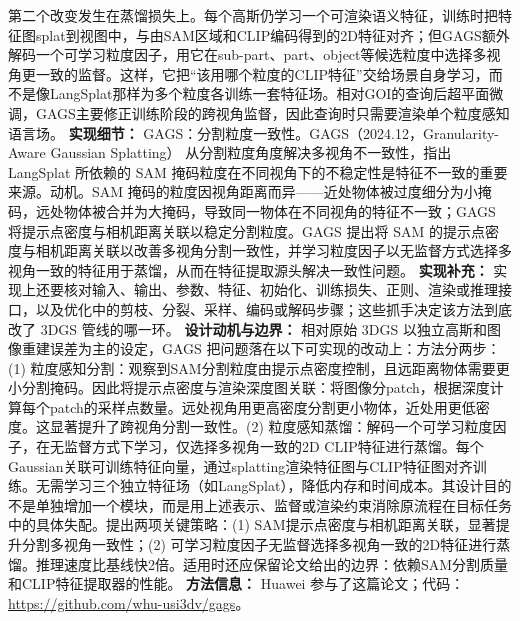 第二个改变发生在蒸馏损失上。每个高斯仍学习一个可渲染语义特征，训练时把特征图splat到视图中，与由SAM区域和CLIP编码得到的2D特征对齐；但GAGS额外解码一个可学习粒度因子，用它在sub-part、part、object等候选粒度中选择多视角更一致的监督。这样，它把“该用哪个粒度的CLIP特征”交给场景自身学习，而不是像LangSplat那样为多个粒度各训练一套特征场。相对GOI的查询后超平面微调，GAGS主要修正训练阶段的跨视角监督，因此查询时只需要渲染单个粒度感知语言场。
\textbf{实现细节：} GAGS：分割粒度一致性。GAGS（2024.12，Granularity-Aware Gaussian Splatting） 从分割粒度角度解决多视角不一致性，指出 LangSplat 所依赖的 SAM 掩码粒度在不同视角下的不稳定性是特征不一致的重要来源。动机。SAM 掩码的粒度因视角距离而异——近处物体被过度细分为小掩码，远处物体被合并为大掩码，导致同一物体在不同视角的特征不一致；GAGS 将提示点密度与相机距离关联以稳定分割粒度。GAGS 提出将 SAM 的提示点密度与相机距离关联以改善多视角分割一致性，并学习粒度因子以无监督方式选择多视角一致的特征用于蒸馏，从而在特征提取源头解决一致性问题。
\textbf{实现补充：} 实现上还要核对输入、输出、参数、特征、初始化、训练损失、正则、渲染或推理接口，以及优化中的剪枝、分裂、采样、编码或解码步骤；这些抓手决定该方法到底改了 3DGS 管线的哪一环。
\textbf{设计动机与边界：} 相对原始 3DGS 以独立高斯和图像重建误差为主的设定，GAGS 把问题落在以下可实现的改动上：方法分两步：(1) 粒度感知分割：观察到SAM分割粒度由提示点密度控制，且远距离物体需要更小分割掩码。因此将提示点密度与渲染深度图关联：将图像分patch，根据深度计算每个patch的采样点数量。远处视角用更高密度分割更小物体，近处用更低密度。这显著提升了跨视角分割一致性。(2) 粒度感知蒸馏：解码一个可学习粒度因子，在无监督方式下学习，仅选择多视角一致的2D CLIP特征进行蒸馏。每个Gaussian关联可训练特征向量，通过splatting渲染特征图与CLIP特征图对齐训练。无需学习三个独立特征场（如LangSplat），降低内存和时间成本。其设计目的不是单独增加一个模块，而是用上述表示、监督或渲染约束消除原流程在目标任务中的具体失配。提出两项关键策略：(1) SAM提示点密度与相机距离关联，显著提升分割多视角一致性；(2) 可学习粒度因子无监督选择多视角一致的2D特征进行蒸馏。推理速度比基线快2倍。适用时还应保留论文给出的边界：依赖SAM分割质量和CLIP特征提取器的性能。
\textbf{方法信息：} Huawei 参与了这篇论文；代码：\url{https://github.com/whu-usi3dv/gags}。



